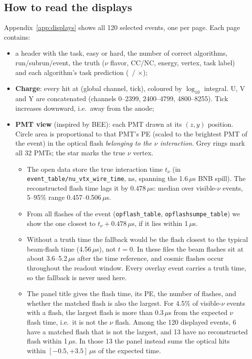 \documentclass[11pt,a4paper]{article}
\newcommand{\code}[1]{\texttt{\small #1}}
\begin{document}
\subsection{How to read the displays}
Appendix~\ref{app:displays} shows all 120 selected events, one per page. Each page contains:
\begin{itemize}
  \item a header with the task, easy or hard, the number of correct algorithms, run/subrun/event, the truth ($\nu$ flavor, CC/NC, energy, vertex, task label) and each algorithm's task prediction (\checkmark\ / $\times$);
  \item \textbf{Charge}: every hit at (global channel, tick), coloured by $\log_{10}$ integral. U, V and Y are concatenated (channels 0--2399, 2400--4799, 4800--8255). Tick increases downward, i.e.\ away from the anode;
  \item \textbf{PMT view} (inspired by BEE): each PMT drawn at its $(z,y)$ position. Circle area is proportional to that PMT's PE (scaled to the brightest PMT of the event) in the optical flash \emph{belonging to the $\nu$ interaction}. Grey rings mark all 32 PMTs; the star marks the true $\nu$ vertex.
  \begin{itemize}
    \item The open data store the true interaction time $t_\nu$ (in \code{event\_table/nu\_vtx\_wire\_time}, ns, spanning the 1.6\,$\mu$s BNB spill). The reconstructed flash time lags it by $0.478\,\mu$s: median over visible-$\nu$ events, 5--95\% range 0.457--0.506\,$\mu$s.
    \item From all flashes of the event (\code{opflash\_table}, \code{opflashsumpe\_table}) we show the one closest to $t_\nu+0.478\,\mu$s, if it lies within 1\,$\mu$s.
    \item Without a truth time the fallback would be the flash closest to the typical beam-flash time (4.56\,$\mu$s), not $t=0$. In these files the beam flashes sit at about 3.6--5.2\,$\mu$s after the time reference, and cosmic flashes occur throughout the readout window. Every overlay event carries a truth time, so the fallback is never used here.
    \item The panel title gives the flash time, its PE, the number of flashes, and whether the matched flash is also the largest. For 4.5\% of visible-$\nu$ events with a flash, the largest flash is more than 0.3\,$\mu$s from the expected $\nu$ flash time, i.e.\ it is not the $\nu$ flash. Among the 120 displayed events, 6 have a matched flash that is not the largest, and 13 have no reconstructed flash within 1\,$\mu$s. In those 13 the panel instead sums the optical hits within $[-0.5,+3.5]\,\mu$s of the expected time.

\end{itemize}
\end{itemize}
\end{document}
